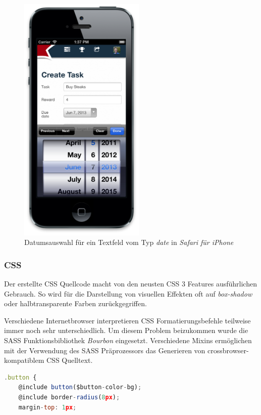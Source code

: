 \begin{figure}[H]
	\centering
	\includegraphics[width=6cm]{content/principle-demonstration/images/iossafari-datepicker.png}
	\caption{Datumsauswahl für ein Textfeld vom Typ \emph{date} in \emph{Safari für iPhone}}
	\label{fig:iossafari-datepicker}
\end{figure}


\subsubsection*{CSS}

Der erstellte CSS Quellcode macht von den neusten CSS 3 Features ausführlichen Gebrauch. So wird für die Darstellung von visuellen Effekten oft auf \emph{box-shadow} oder halbtransparente Farben zurückgegriffen.

Verschiedene Internetbrowser interpretieren CSS Formatierungsbefehle teilweise immer noch sehr unterschiedlich. Um diesem Problem beizukommen wurde die SASS Funktionsbibliothek \emph{Bourbon} \cite{bourbon} eingesetzt. Verschiedene Mixins ermöglichen mit der Verwendung des SASS Präprozessors \cite{SASS} das Generieren von crossbrowser-kompatiblem CSS Quelltext.

\begin{lstlisting}[language=JavaScript, firstnumber=4, caption={Einbindung des \emph{@border-radius} Mixins von \emph{Bourbon} \cite{RoomiesSassBorderRadiusMixin}}, label={lst:roomiesSassBorderRadiusMixin}]
.button {
	@include button($button-color-bg);
	@include border-radius(8px);
	margin-top: 1px;
\end{lstlisting}

